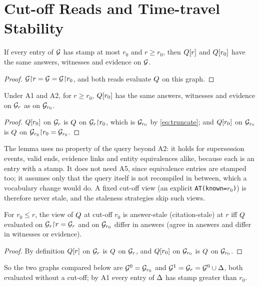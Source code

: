 \section{Cut-off Reads and Time-travel Stability}\label{sec:s-stability}

\begin{lemma}\label{lem:collapse}
If every entry of $\mathcal G$ has stamp at most $r_0$ and $r\ge r_0$, then $Q[r]$ and
$Q[r_0]$ have the same answers, witnesses and evidence on $\mathcal G$.
\end{lemma}
\begin{proof}
$\mathcal G{\restriction}r=\mathcal G=\mathcal G{\restriction}r_0$, and both reads evaluate $Q$ on this graph.
\end{proof}

\begin{lemma}\label{prop:s-stability}
Under A1 and A2, for $r\ge r_0$, $Q[r_0]$ has the same answers, witnesses and evidence on
$\mathcal G_r$ as on $\mathcal G_{r_0}$.
\end{lemma}
\begin{proof}
$Q[r_0]$ on $\mathcal G_r$ is $Q$ on $\mathcal G_r{\restriction}r_0$, which is $\mathcal G_{r_0}$ by
\eqref{eq:truncate}; and $Q[r_0]$ on $\mathcal G_{r_0}$ is $Q$ on $\mathcal G_{r_0}{\restriction}r_0=
\mathcal G_{r_0}$.
\end{proof}

\noindent The lemma uses no property of the query beyond A2: it holds for supersession
events, valid ends, evidence links and entity equivalences alike, because each is an entry with a
stamp. It does not need A5, since equivalence entries are stamped too; it assumes only that the
query itself is not recompiled in between, which a vocabulary change would do. A fixed cut-off view (an explicit \texttt{AT(known=}$r_0$\texttt{)}) is therefore
never stale, and the staleness strategies skip such views.

\begin{corollary}[Reduction]\label{cor:reduction}
For $r_0\le r$, the view of $Q$ at cut-off $r_0$ is answer-stale (citation-stale) at $r$ iff
$Q$ evaluated on $\mathcal G_r{\restriction}r=\mathcal G_r$ and on $\mathcal G_{r_0}$ differ in answers (agree in answers
and differ in witnesses or evidence).
\end{corollary}
\begin{proof}
By definition $Q[r]$ on $\mathcal G_r$ is $Q$ on $\mathcal G_r$, and $Q[r_0]$ on $\mathcal G_{r_0}$ is $Q$
on $\mathcal G_{r_0}$.
\end{proof}

\noindent So the two graphs compared below are $\mathcal G^0=\mathcal G_{r_0}$ and $\mathcal G^1=\mathcal G_r=\mathcal G^0\cup\Delta$, both
evaluated without a cut-off; by A1 every entry of $\Delta$ has stamp greater than $r_0$.
